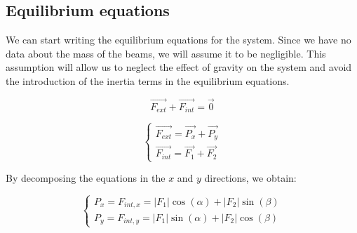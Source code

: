 \subsection{Equilibrium equations}
\label{subsec:equilibrium_equations}

We can start writing the equilibrium equations for the system.
Since we have no data about the mass of the beams, we will assume it to be negligible.
This assumption will allow us to neglect the effect of gravity on the system and avoid the introduction of the inertia terms in the equilibrium equations.

\begin{equation}
    \vec{F_{ext}} + \vec{F_{int}} = \vec{0}
    \label{eq:equilibrium_equations_vectorial_1}
\end{equation}

\begin{equation}
    \begin{cases}
        \vec{F_{ext}} = \vec{P_x} + \vec{P_y} \\
        \vec{F_{int}} = \vec{F_1} + \vec{F_2}
    \end{cases}
    \label{eq:equilibrium_equations_vectorial_2}
\end{equation}

By decomposing the equations in the $x$ and $y$ directions, we obtain:

\begin{equation}
    \begin{cases}
        P_x = F_{int,x} = |F_1|\cos(\alpha) + |F_2|\sin(\beta) \\
        P_y = F_{int,y} = |F_1|\sin(\alpha) + |F_2|\cos(\beta)
    \end{cases}
    \label{eq:equilibrium_equations_scalar}
\end{equation}